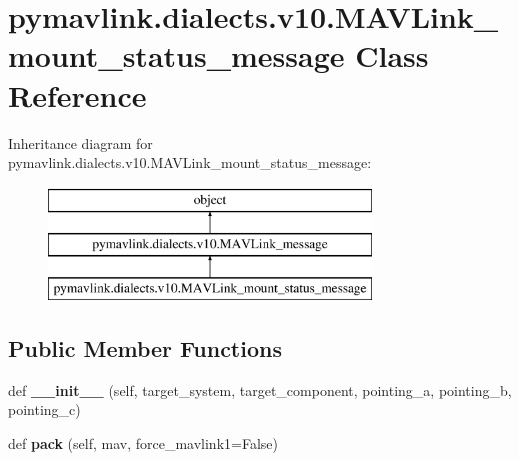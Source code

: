 \hypertarget{classpymavlink_1_1dialects_1_1v10_1_1MAVLink__mount__status__message}{}\section{pymavlink.\+dialects.\+v10.\+M\+A\+V\+Link\+\_\+mount\+\_\+status\+\_\+message Class Reference}
\label{classpymavlink_1_1dialects_1_1v10_1_1MAVLink__mount__status__message}
Inheritance diagram for pymavlink.\+dialects.\+v10.\+M\+A\+V\+Link\+\_\+mount\+\_\+status\+\_\+message\+:\begin{figure}[H]
\begin{center}
\leavevmode
\includegraphics[height=3.000000cm]{classpymavlink_1_1dialects_1_1v10_1_1MAVLink__mount__status__message}
\end{center}
\end{figure}
\subsection*{Public Member Functions}
\begin{DoxyCompactItemize}
\item 
\mbox{\label{classpymavlink_1_1dialects_1_1v10_1_1MAVLink__mount__status__message_a1f9a53ecf0d96fc90aa2096002cb35b4}} 
def {\bfseries \+\_\+\+\_\+init\+\_\+\+\_\+} (self, target\+\_\+system, target\+\_\+component, pointing\+\_\+a, pointing\+\_\+b, pointing\+\_\+c)
\item 
\mbox{\label{classpymavlink_1_1dialects_1_1v10_1_1MAVLink__mount__status__message_a20a3eaabee5ba5fab5aa7ec2ab784a60}} 
def {\bfseries pack} (self, mav, force\+\_\+mavlink1=False)
\end{DoxyCompactItemize}
